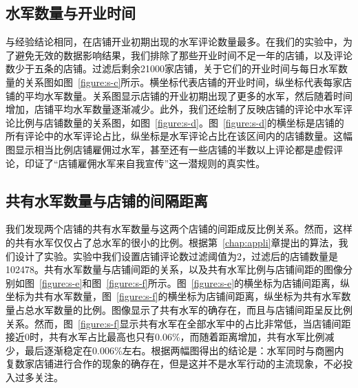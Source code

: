 \subsection{水军数量与开业时间}

与经验结论相同，在店铺开业初期出现的水军评论数量最多。在我们的实验中，为了避免无效的数据影响结果，我们排除了那些开业时间不足一年的店铺，以及评论数少于五条的店铺。过滤后剩余21000家店铺，关于它们的开业时间与每日水军数量的关系图如图~\ref{figure:s-c}所示。横坐标代表店铺的开业时间，纵坐标代表每家店铺的平均水军数量。关系图显示店铺的开业初期出现了更多的水军，然后随着时间增加，店铺平均水军数量逐渐减少。此外，我们还绘制了反映店铺的评论中水军评论比例与店铺数量的关系图，如图~\ref{figure:s-d}。图~\ref{figure:s-d}的横坐标是店铺的所有评论中的水军评论占比，纵坐标是水军评论占比在该区间内的店铺数量。这幅图显示相当比例店铺雇佣过水军，甚至还有一些店铺的半数以上评论都是虚假评论，印证了“店铺雇佣水军来自我宣传”这一潜规则的真实性。


\subsection{共有水军数量与店铺的间隔距离}

我们发现两个店铺的共有水军数量与这两个店铺的间距成反比例关系。然而，这样的共有水军仅仅占了总水军的很小的比例。根据第~\ref{chap:appli}章提出的算法，我们设计了实验。实验中我们设置店铺评论数过滤阈值为2，过滤后的店铺数量是102478。共有水军数量与店铺间距的关系，以及共有水军比例与店铺间距的图像分别如图~\ref{figure:s-e}和图~\ref{figure:s-f}所示。图~\ref{figure:s-e}的横坐标为店铺间距离，纵坐标为共有水军数量，图~\ref{figure:s-f}的横坐标为店铺间距离，纵坐标为共有水军数量占总水军数量的比例。图像显示了共有水军的确存在，而且与店铺间距呈反比例关系。然而，图~\ref{figure:s-f}显示共有水军在全部水军中的占比非常低，当店铺间距接近0时，共有水军占比最高也只有0.06\%，而随着距离增加，共有水军比例减少，最后逐渐稳定在0.006\%左右。根据两幅图得出的结论是：水军同时与商圈内复数家店铺进行合作的现象的确存在，但是这并不是水军行动的主流现象，不必投入过多关注。



